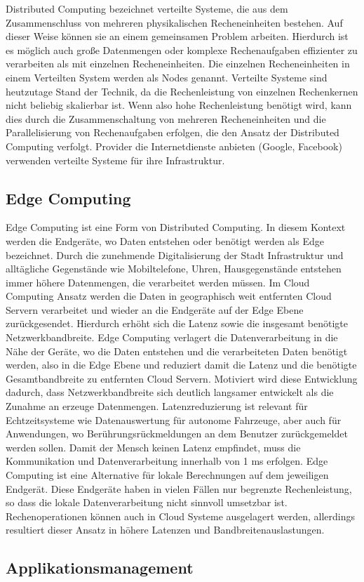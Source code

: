 Distributed Computing bezeichnet verteilte Systeme, die aus dem Zusammenschluss von mehreren physikalischen Recheneinheiten bestehen. Auf dieser Weise können sie an einem gemeinsamen Problem arbeiten. Hierdurch ist es möglich auch große Datenmengen oder komplexe Rechenaufgaben effizienter zu verarbeiten als mit einzelnen Recheneinheiten. \cite{AWS2023} Die einzelnen Recheneinheiten in einem Verteilten System werden als Nodes genannt. \cite{ord1994scale} Verteilte Systeme sind heutzutage Stand der Technik, da die Rechenleistung von einzelnen Rechenkernen nicht beliebig skalierbar ist. Wenn also hohe Rechenleistung benötigt wird, kann dies  durch die Zusammenschaltung von mehreren Recheneinheiten und die Parallelisierung von Rechenaufgaben erfolgen, die den Ansatz der Distributed Computing verfolgt. Provider die Internetdienste anbieten (Google, Facebook) verwenden verteilte Systeme für ihre Infrastruktur. \cite{arpaci2018operating} 

\subsection*{Edge Computing}

Edge Computing ist eine Form von Distributed Computing. In diesem Kontext werden die Endgeräte, wo Daten entstehen oder benötigt werden als Edge bezeichnet. Durch die zunehmende Digitalisierung der Stadt Infrastruktur und alltägliche Gegenstände wie Mobiltelefone, Uhren, Hausgegenstände entstehen immer höhere Datenmengen, die verarbeitet werden müssen. Im Cloud Computing Ansatz werden die Daten in geographisch weit entfernten Cloud Servern verarbeitet und wieder an die Endgeräte auf der Edge Ebene zurückgesendet. Hierdurch erhöht sich die Latenz sowie die insgesamt benötigte Netzwerkbandbreite. Edge Computing verlagert die Datenverarbeitung in die Nähe der Geräte, wo die Daten entstehen und die verarbeiteten Daten benötigt werden, also in die Edge Ebene und reduziert damit die Latenz und die benötigte Gesamtbandbreite zu entfernten Cloud Servern. \cite{Wang2019} Motiviert wird diese Entwicklung dadurch, dass Netzwerkbandbreite sich deutlich langsamer entwickelt als die Zunahme an erzeuge Datenmengen.\cite{Shi2016} Latenzreduzierung ist relevant für Echtzeitsysteme wie Datenauswertung für autonome Fahrzeuge, aber auch für Anwendungen, wo Berührungsrückmeldungen an dem Benutzer zurückgemeldet werden sollen. Damit der Mensch keinen Latenz empfindet, muss die Kommunikation und Datenverarbeitung innerhalb von 1 ms erfolgen. \cite{Varsha2017} Edge Computing ist eine Alternative für lokale Berechnungen auf dem jeweiligen Endgerät. Diese Endgeräte haben in vielen Fällen nur begrenzte Rechenleistung, so dass die lokale Datenverarbeitung nicht sinnvoll umsetzbar ist. Rechenoperationen können auch in Cloud Systeme ausgelagert werden, allerdings resultiert dieser Ansatz in höhere Latenzen und Bandbreitenauslastungen. \cite{Lin2020}

\subsection*{Applikationsmanagement}

